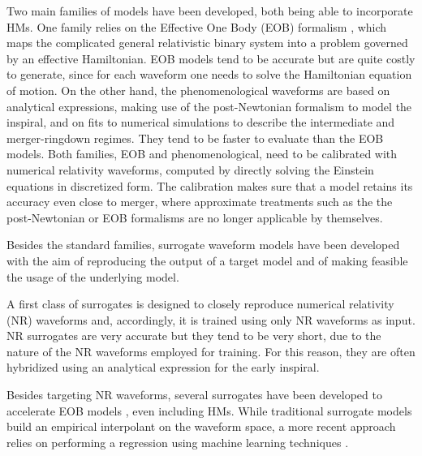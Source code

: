 \documentclass[twocolumn,showpacs,preprintnumbers,nofootinbib,prd,
superscriptaddress,10pt]{revtex4-2}
\begin{document}
Two main families of models have been developed, both being able to incorporate HMs.
One family relies on the Effective One Body (EOB) formalism 
\cite{Buonanno:2000ef, Damour:2009kr, Cotesta:2018fcv, Nagar:2020pcj, Chiaramello:2020ehz, Ossokine:2020kjp, Ramos-Buades:2023ehm, Nagar:2021gss}, 
which maps the complicated general relativistic binary system into a problem governed by an effective Hamiltonian. 
EOB models tend to be accurate but are quite costly to generate, since for each waveform one needs to solve the 
Hamiltonian equation of motion.
On the other hand, the phenomenological waveforms \cite{Khan:2015jqa,Pratten:2020ceb,Estelles:2020osj} are based on 
analytical expressions, making use of the post-Newtonian formalism to model the inspiral, and on fits to numerical
simulations to describe the intermediate and merger-ringdown regimes. They tend to be faster to evaluate than the EOB models.
Both families, EOB and phenomenological, need to be calibrated with numerical relativity waveforms, 
computed by directly solving the Einstein equations in discretized form. The calibration makes sure that a model 
retains its accuracy even close to merger, where approximate treatments such as the the post-Newtonian or EOB formalisms 
are no longer applicable by themselves.

Besides the standard families, surrogate waveform models have been developed with the aim of reproducing the 
output of a target model and of making feasible the usage of the underlying model.

A first class of surrogates is designed to closely reproduce numerical relativity (NR) waveforms \cite{Blackman:2015pia, Varma:2018mmi, Blackman:2017dfb, Blackman:2017pcm, Varma:2019csw, Williams:2019vub, Rifat:2019ltp} and, accordingly, it is trained using only NR waveforms as input. NR surrogates are very accurate but they tend to be very short, due to the nature of the NR waveforms employed for training. For this reason, they are often hybridized using an analytical expression for the early inspiral.

Besides targeting NR waveforms, several surrogates have been developed to accelerate EOB models \cite{Field:2013cfa, Purrer:2014fza, Purrer:2015tud, Cotesta:2020qhw, Gadre:2022sed}, even including HMs. While traditional surrogate 
models build an empirical interpolant on the waveform space, a more recent approach relies on performing a regression 
using machine learning techniques \cite{Chua:2018woh, Khan:2020fso, Thomas:2022rmc, Tissino:2022thn}.
\end{document}
